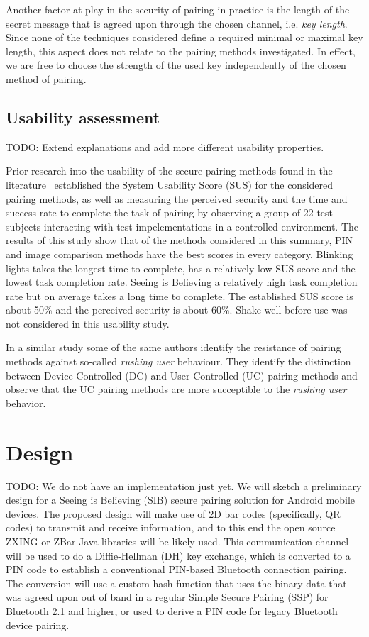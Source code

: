 \documentclass[conference, 11pt]{sty/IEEEtran}
\begin{document}

Another factor at play in the security of pairing in practice is the length of the secret message that is agreed upon through the chosen channel, i.e. \emph{key length}.
Since none of the techniques considered define a required minimal or maximal key length, this aspect does not relate to the pairing methods investigated.
In effect, we are free to choose the strength of the used key independently of the chosen method of pairing.

\subsection{Usability assessment}
\label{ssec:usability_assessment}

TODO: Extend explanations and add more different usability properties.

Prior research into the usability of the secure pairing methods found in the literature~\cite{kumar2009comparative} established the System Usability Score (SUS) for the considered pairing methods, as well as measuring the perceived security and the time and success rate to complete the task of pairing by observing a group of 22 test subjects interacting with test impelementations in a controlled environment.
The results of this study show that of the methods considered in this summary, PIN and image comparison methods have the best scores in every category.
Blinking lights takes the longest time to complete, has a relatively low SUS score and the lowest task completion rate.
Seeing is Believing a relatively high task completion rate but on average takes a long time to complete.
The established SUS score is about 50\% and the perceived security is about 60\%.
Shake well before use was not considered in this usability study.

In a similar study \cite{kobsa2009serial} some of the same authors identify the resistance of pairing methods against so-called \textit{rushing user} behaviour.
They identify the distinction between Device Controlled (DC) and User Controlled (UC) pairing methods and observe that the UC pairing methods are more succeptible to the \textit{rushing user} behavior.

\section{Design}
\label{sec:design}

TODO: We do not have an implementation just yet.
We will sketch a preliminary design for a Seeing is Believing (SIB) secure pairing solution for Android mobile devices.
The proposed design will make use of 2D bar codes (specifically, QR codes) to transmit and receive information, and to this end the open source ZXING or ZBar Java libraries will be likely used.
This communication channel will be used to do a Diffie-Hellman (DH) key exchange, which is converted to a PIN code to establish a conventional PIN-based Bluetooth connection pairing.
The conversion will use a custom hash function that uses the binary data that was agreed upon out of band in a regular Simple Secure Pairing (SSP) for Bluetooth 2.1 and higher, or used to derive a PIN code for legacy Bluetooth device pairing.
\end{document}
